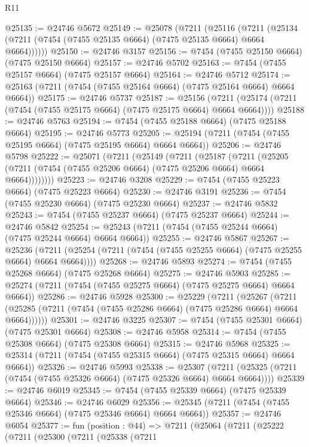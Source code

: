 \begin{lexlean}{R11}
\begin{coremodule}
{{{{{{{{{{{{{{{{{{{{{{{{{{{{{{{{{{{{{{{{{{{{{{{{{{{{{{{{{{{{{{{{{{{{{{{{{{{{{{{{{{@25135 := @24746 @5672
@25149 := @25078
    (@7211
      (@25116
        (@7211 (@25134 (@7211 (@7454 (@7455 @25135 @6664) (@7475 @25135 @6664) @6664 @6664))))))
@25150 := @24746 @3157
@25156 := @7454 (@7455 @25150 @6664) (@7475 @25150 @6664)
@25157 := @24746 @5702
@25163 := @7454 (@7455 @25157 @6664) (@7475 @25157 @6664)
@25164 := @24746 @5712
@25174 := @25163 (@7211 (@7454 (@7455 @25164 @6664) (@7475 @25164 @6664) @6664 @6664))
@25175 := @24746 @5737
@25187 := @25156
    (@7211 (@25174 (@7211 (@7454 (@7455 @25175 @6664) (@7475 @25175 @6664) @6664 @6664))))
@25188 := @24746 @5763
@25194 := @7454 (@7455 @25188 @6664) (@7475 @25188 @6664)
@25195 := @24746 @5773
@25205 := @25194 (@7211 (@7454 (@7455 @25195 @6664) (@7475 @25195 @6664) @6664 @6664))
@25206 := @24746 @5798
@25222 := @25071
    (@7211
      (@25149
        (@7211
          (@25187
            (@7211
              (@25205 (@7211 (@7454 (@7455 @25206 @6664) (@7475 @25206 @6664) @6664 @6664))))))))
@25223 := @24746 @3208
@25229 := @7454 (@7455 @25223 @6664) (@7475 @25223 @6664)
@25230 := @24746 @3191
@25236 := @7454 (@7455 @25230 @6664) (@7475 @25230 @6664)
@25237 := @24746 @5832
@25243 := @7454 (@7455 @25237 @6664) (@7475 @25237 @6664)
@25244 := @24746 @5842
@25254 := @25243 (@7211 (@7454 (@7455 @25244 @6664) (@7475 @25244 @6664) @6664 @6664))
@25255 := @24746 @5867
@25267 := @25236
    (@7211 (@25254 (@7211 (@7454 (@7455 @25255 @6664) (@7475 @25255 @6664) @6664 @6664))))
@25268 := @24746 @5893
@25274 := @7454 (@7455 @25268 @6664) (@7475 @25268 @6664)
@25275 := @24746 @5903
@25285 := @25274 (@7211 (@7454 (@7455 @25275 @6664) (@7475 @25275 @6664) @6664 @6664))
@25286 := @24746 @5928
@25300 := @25229
    (@7211
      (@25267
        (@7211 (@25285 (@7211 (@7454 (@7455 @25286 @6664) (@7475 @25286 @6664) @6664 @6664))))))
@25301 := @24746 @3225
@25307 := @7454 (@7455 @25301 @6664) (@7475 @25301 @6664)
@25308 := @24746 @5958
@25314 := @7454 (@7455 @25308 @6664) (@7475 @25308 @6664)
@25315 := @24746 @5968
@25325 := @25314 (@7211 (@7454 (@7455 @25315 @6664) (@7475 @25315 @6664) @6664 @6664))
@25326 := @24746 @5993
@25338 := @25307
    (@7211 (@25325 (@7211 (@7454 (@7455 @25326 @6664) (@7475 @25326 @6664) @6664 @6664))))
@25339 := @24746 @6019
@25345 := @7454 (@7455 @25339 @6664) (@7475 @25339 @6664)
@25346 := @24746 @6029
@25356 := @25345 (@7211 (@7454 (@7455 @25346 @6664) (@7475 @25346 @6664) @6664 @6664))
@25357 := @24746 @6054
@25377 := fun (position : @44) =>
  @7211
    (@25064
      (@7211
        (@25222
          (@7211
            (@25300
              (@7211
                (@25338
                  (@7211
}}}}}}}}}}}}}}}}}}}}}}}}}}}}}}}}}}}}}}}}}}}}}}}}}}}}}}}}}}}}}}}}}}}}}}}}}}}}}}}}}}
\end{coremodule}
\end{lexlean}
